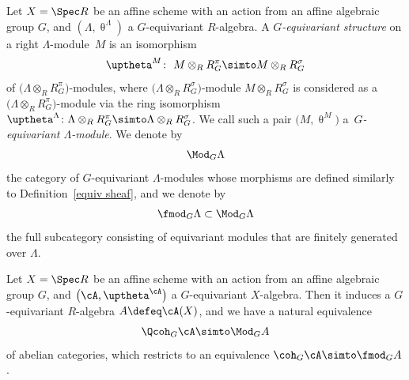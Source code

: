\begin{dfn}%
Let $X=\Spec R$ be an affine scheme with an action from an affine algebraic group $G$, and $(\Lambda,\uptheta^{\Lambda})$ a $G$-equivariant $R$-algebra. A {\it $G$-equivariant structure} on a right $\Lambda$-module~$M$ is an isomorphism
\begin{gather*}
\uptheta^M\colon\ M\otimes_RR_G^{\pi}\simto M\otimes_RR_G^{\sigma}
\end{gather*}
of $\big(\Lambda\otimes_RR_G^{\pi}\big)$-modules, where $\big(\Lambda\otimes_RR_G^{\sigma}\big)$-module $M\otimes_RR_G^{\sigma}$ is considered as a $\big(\Lambda\otimes_RR_G^{\pi}\big)$-mo\-dule via the ring isomorphism $\uptheta^{\Lambda}\colon \Lambda\otimes_RR_G^{\pi}\simto\Lambda\otimes_RR_G^{\sigma}$. We call such a pair $\big(M,\uptheta^M\big)$ a~{\it $G$-equivariant $\Lambda$-module}. We denote by
\begin{gather*}
\Mod_G\Lambda
\end{gather*}
the category of $G$-equivariant $\Lambda$-modules whose morphisms are defined similarly to Definition~\ref{equiv sheaf}, and we denote by
\begin{gather*}
\fmod_G\Lambda\subset \Mod_G\Lambda
\end{gather*}
the full subcategory consisting of equivariant modules that are finitely generated over $\Lambda$.
\end{dfn}

\begin{rem}
Let $X=\Spec R$ be an affine scheme with an action from an affine algebraic group $G$, and $\big(\cA,\uptheta^{\cA}\big)$ a $G$-equivariant $X$-algebra. Then it induces a $G$-equivariant $R$-algebra $A\defeq\cA(X)$, and we have a natural equivalence
\begin{gather*}
\Qcoh_G\cA\simto\Mod_GA
\end{gather*}
of abelian categories, which restricts to an equivalence $\coh_G\cA\simto\fmod_GA$.
\end{rem}
\vspace{1mm}



